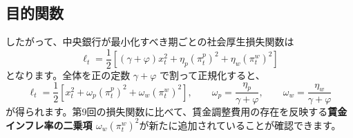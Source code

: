 \documentclass[
  japanese,
  lualatex,
  ja=standard,
  12pt,
  a4paper]{ltjsarticle}
\begin{document}
\subsection{目的関数}\label{ux76eeux7684ux95a2ux6570}

したがって、中央銀行が最小化すべき期ごとの社会厚生損失関数は \[
\ell_t
=
\frac{1}{2}
\left[
(\gamma+\varphi)x_t^2
+
\eta_p(\pi_t^p)^2
+
\eta_w(\pi_t^w)^2
\right]
\] となります。全体を正の定数 \(\gamma+\varphi\) で割って正規化すると、
\[
\ell_t
=
\frac{1}{2}
\left[
x_t^2
+
\omega_p(\pi_t^p)^2
+
\omega_w(\pi_t^w)^2
\right],
\qquad
\omega_p
=
\frac{\eta_p}{\gamma+\varphi},
\qquad
\omega_w
=
\frac{\eta_w}{\gamma+\varphi}
\]
が得られます。第9回の損失関数に比べて、賃金調整費用の存在を反映する\textbf{賃金インフレ率の二乗項
\(\omega_w(\pi_t^w)^2\)}が新たに追加されていることが確認できます。
\end{document}
